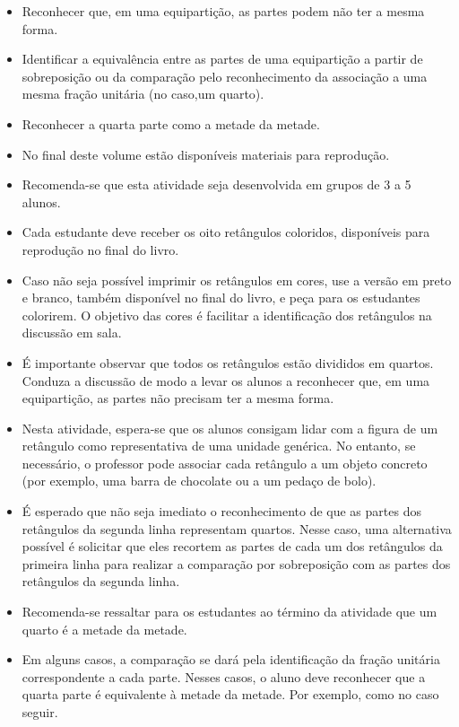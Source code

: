 \begin{multicols}{2}
\begin{objetivos}{}{}
  \begin{itemize} %
    \item       Reconhecer que, em uma equipartição, as partes podem não ter a mesma forma.
    \item       Identificar a equivalência entre as partes de uma equipartição a partir de sobreposição ou da comparação pelo reconhecimento da associação a uma mesma fração unitária (no caso,um quarto).
    \item       Reconhecer a quarta parte como a metade da metade.
\end{itemize} %
\end{objetivos}

\begin{orientacoes}
  \begin{itemize} %
    \item No final deste volume estão disponíveis materiais para reprodução.
    \item Recomenda-se que esta atividade seja desenvolvida em grupos de 3 a 5 alunos.
    \item Cada estudante deve receber os oito retângulos coloridos, disponíveis para reprodução no final do livro.
    \item Caso não seja possível imprimir os retângulos em cores, use a versão em preto e branco, também disponível no final do livro, e peça para os estudantes colorirem. O objetivo das cores é facilitar a identificação dos retângulos na discussão em sala.
    \item É importante observar que todos os retângulos estão divididos em quartos. Conduza a discussão de modo a levar os alunos a reconhecer que, em uma equipartição, as partes não precisam ter a mesma forma.
    \item Nesta atividade, espera-se que os alunos consigam lidar com a figura de um retângulo como representativa de uma unidade genérica.  No entanto, se necessário, o professor pode associar cada retângulo a um objeto concreto (por exemplo, uma barra de chocolate ou a um pedaço de bolo).
    \item É esperado que não seja imediato o reconhecimento de que as partes dos retângulos da segunda linha representam quartos. Nesse caso,  uma alternativa possível é solicitar que eles recortem as partes de cada um dos retângulos da primeira linha para realizar a comparação por sobreposição com as partes dos retângulos da segunda linha.
   \item Recomenda-se ressaltar para os estudantes ao término da atividade que um quarto é a metade da metade.
    \item Em alguns casos, a comparação se dará pela identificação da fração unitária correspondente a cada parte. Nesses casos, o aluno deve reconhecer que a quarta parte é equivalente à metade da metade. Por exemplo, como no caso seguir.
 

\end{itemize}
\end{orientacoes}
\end{multicols}
